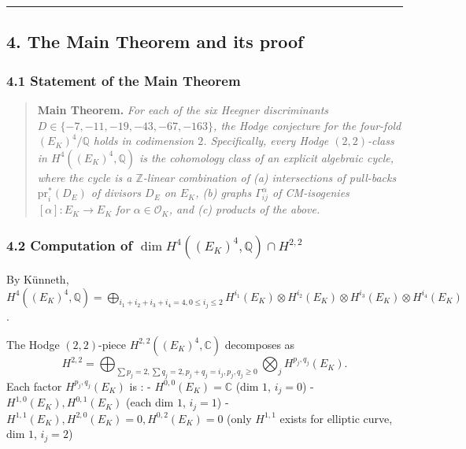 \documentclass[
  11pt,
  a4paper,
]{amsart}
\begin{document}
\begin{center}\rule{0.5\linewidth}{0.5pt}\end{center}

\hypertarget{the-main-theorem-corrected-and-its-proof}{%
\subsection{4. The Main Theorem and its proof}\label{the-main-theorem-corrected-and-its-proof}}

\hypertarget{statement-of-the-corrected-main-theorem}{%
\subsubsection{4.1 Statement of the Main Theorem}\label{statement-of-the-corrected-main-theorem}}

\begin{quote}
\textbf{Main Theorem.} \emph{For each of the six Heegner discriminants \(D \in \{-7,-11,-19,-43,-67,-163\}\), the Hodge conjecture for the four-fold \((E_K)^4 / \mathbb{Q}\) holds in codimension \(2\). Specifically, every Hodge \((2,2)\)-class in \(H^4((E_K)^4, \mathbb{Q})\) is the cohomology class of an explicit algebraic cycle, where the cycle is a \(\mathbb{Z}\)-linear combination of (a) intersections of pull-backs \(\mathrm{pr}_i^*(D_E)\) of divisors \(D_E\) on \(E_K\), (b) graphs \(\Gamma_{ij}^\alpha\) of CM-isogenies \([\alpha] : E_K \to E_K\) for \(\alpha \in \mathcal{O}_K\), and (c) products of the above.}
\end{quote}

\hypertarget{computation-of-dim-h4e_k4-mathbbq-cap-h22}{%
\subsubsection{\texorpdfstring{4.2 Computation of \(\dim H^4((E_K)^4, \mathbb{Q}) \cap H^{2,2}\)}{4.2 Computation of \textbackslash dim H\^{}4((E\_K)\^{}4, \textbackslash mathbb\{Q\}) \textbackslash cap H\^{}\{2,2\}}}\label{computation-of-dim-h4e_k4-mathbbq-cap-h22}}

By Künneth, \(H^4((E_K)^4, \mathbb{Q}) = \bigoplus_{i_1 + i_2 + i_3 + i_4 = 4, 0 \leq i_j \leq 2} H^{i_1}(E_K) \otimes H^{i_2}(E_K) \otimes H^{i_3}(E_K) \otimes H^{i_4}(E_K)\).

The Hodge \((2,2)\)-piece \(H^{2,2}((E_K)^4, \mathbb{C})\) decomposes as
\begin{equation}
H^{2,2} = \bigoplus_{\sum p_j = 2, \sum q_j = 2, p_j + q_j = i_j, p_j, q_j \geq 0} \bigotimes_j H^{p_j, q_j}(E_K).
\tag{4.1}
\end{equation}
Each factor \(H^{p_j, q_j}(E_K)\) is :
- \(H^{0,0}(E_K) = \mathbb{C}\) (dim \(1\), \(i_j = 0\))
- \(H^{1,0}(E_K), H^{0,1}(E_K)\) (each dim \(1\), \(i_j = 1\))
- \(H^{1,1}(E_K), H^{2,0}(E_K) = 0, H^{0,2}(E_K) = 0\) (only \(H^{1,1}\) exists for elliptic curve, dim \(1\), \(i_j = 2\))
\end{document}
